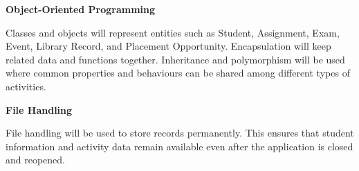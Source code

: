 \documentclass[11pt,a4paper]{article}
\newenvironment{sectionblock}
{%
    \par
    \needspace{8\baselineskip}
}
{%
    \par
}
\begin{document}
\begin{sectionblock}
{\textbf{Object-Oriented Programming}

Classes and objects will represent entities such as Student, Assignment, Exam, Event, Library Record, and Placement Opportunity. Encapsulation will keep related data and functions together. Inheritance and polymorphism will be used where common properties and behaviours can be shared among different types of activities.

\textbf{File Handling}

File handling will be used to store records permanently. This ensures that student information and activity data remain available even after the application is closed and reopened.

}

\end{sectionblock}

\vspace{6mm}

\end{document}
